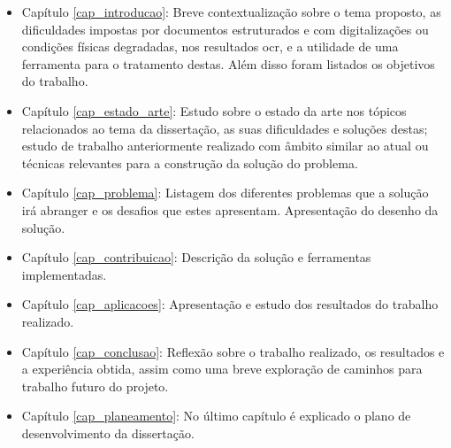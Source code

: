 \begin{itemize}
    \item Capítulo \ref{cap_introducao}: Breve contextualização sobre o tema proposto, as dificuldades impostas por documentos estruturados e com digitalizações ou condições físicas degradadas, nos resultados \acrshort{ocr}, e a utilidade de uma ferramenta para o tratamento destas. Além disso foram listados os objetivos do trabalho.

    \item Capítulo \ref{cap_estado_arte}: Estudo sobre o estado da arte nos tópicos relacionados ao tema da dissertação, as suas dificuldades e soluções destas; estudo de trabalho anteriormente realizado com âmbito similar ao atual ou técnicas relevantes para a construção da solução do problema.

    \item Capítulo \ref{cap_problema}: Listagem dos diferentes problemas que a solução irá abranger e os desafios que estes apresentam. Apresentação do desenho da solução.

    \item Capítulo \ref{cap_contribuicao}: Descrição da solução e ferramentas implementadas.

    \item Capítulo \ref{cap_aplicacoes}: Apresentação e estudo dos resultados do trabalho realizado.

    \item Capítulo \ref{cap_conclusao}: Reflexão sobre o trabalho realizado, os resultados e a experiência obtida, assim como uma breve exploração de caminhos para trabalho futuro do projeto. 

    \item Capítulo \ref{cap_planeamento}: No último capítulo é explicado o plano de desenvolvimento da dissertação.
\end{itemize}
